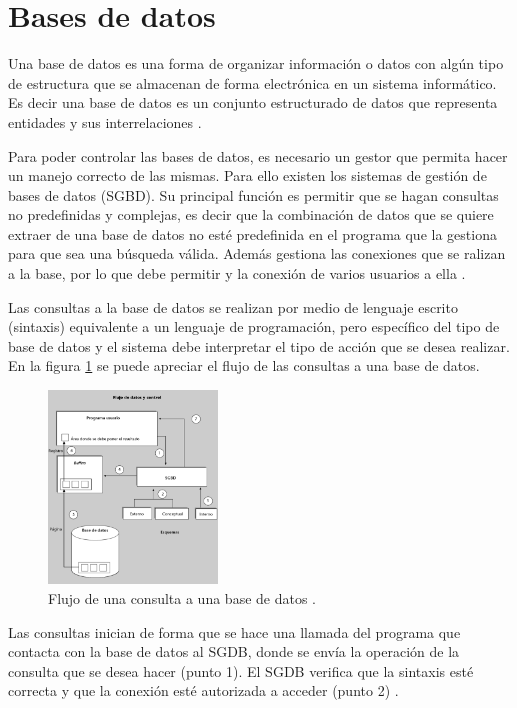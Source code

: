\section{Bases de datos}
Una base de datos es una forma de organizar información o datos con algún tipo de estructura que se almacenan de forma electrónica en un sistema informático. Es decir una base de datos es un conjunto estructurado de datos que representa entidades y sus interrelaciones \cite{camps_paré_2005}.
\par
Para poder controlar las bases de datos, es necesario un gestor que permita hacer un manejo correcto de las mismas. Para ello existen los sistemas de gestión de bases de datos (SGBD). Su principal función es permitir que se hagan consultas no predefinidas y complejas, es decir que la combinación de datos que se quiere extraer de una base de datos no esté predefinida en el programa que la gestiona para que sea una búsqueda válida. Además gestiona las conexiones que se ralizan a la base, por lo que debe permitir y la conexión de varios usuarios a ella \cite{camps_paré_2005}.
\par
Las consultas a la base de datos se realizan por medio de lenguaje escrito (sintaxis) equivalente a un lenguaje de programación, pero específico del tipo de base de datos y el sistema debe interpretar el tipo de acción que se desea realizar. En la figura \ref{BDflux} se puede apreciar el flujo de las consultas a una base de datos. 
\begin{figure}[h!]
    \centering
    \includegraphics[width=0.4\textwidth]{imagenes/marco teorico/flujo_BD.png}
    \caption{Flujo de una consulta a una base de datos \cite{camps_paré_2005}.}
    \label{BDflux}
\end{figure}
\par
Las consultas inician de forma que se hace una llamada del programa que contacta con la base de datos al SGDB, donde se envía la operación de la consulta que se desea hacer (punto 1). El SGDB verifica que la sintaxis esté correcta y que la conexión esté autorizada a acceder (punto 2) \cite{camps_paré_2005}. 
